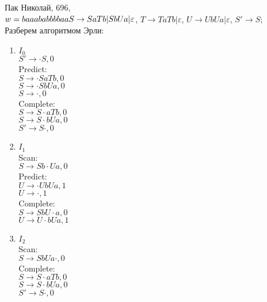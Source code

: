 \documentclass{article}
\begin{document}
	\LARGE
		Пак Николай, 696,  \\
		$w = baaababbbbaa\\
		S\rightarrow SaTb | 	SbUa|\varepsilon$,  $T \rightarrow TaTb| \varepsilon$, $U \rightarrow UbUa| \varepsilon$, $S' \rightarrow S$;\\
		Разберем алгоритмом Эрли:\\
	\begin{enumerate}
		\item $I_0$\\
		$S'\rightarrow  \cdot S,0$\\
		Predict:\\
		$S \rightarrow \cdot SaTb,0$\\
		$S \rightarrow \cdot SbUa,0$\\
		$S \rightarrow \cdot ,0$\\		
		Complete:\\
		$S \rightarrow  S \cdot aTb,0$\\
		$S \rightarrow S  \cdot bUa,0$\\
		$S' \rightarrow S \cdot, 0$\\
		
		\item $I_1$\\
		Scan:\\ 
		$S \rightarrow Sb \cdot Ua,0$\\
		Predict:\\
		$U \rightarrow \cdot UbUa, 1$\\
		$U \rightarrow \cdot, 1$\\
		Complete:\\
		$S \rightarrow SbU \cdot a,0$\\
		$U \rightarrow U \cdot bUa, 1$\\
		
		\item $I_2$\\
		Scan:\\
		$S \rightarrow SbU a \cdot ,0$\\
		Complete:\\
		$S \rightarrow  S \cdot aTb,0$\\
		$S \rightarrow S  \cdot bUa,0$\\
		$S' \rightarrow S \cdot, 0$\\
		

\end{enumerate}
\end{document}
